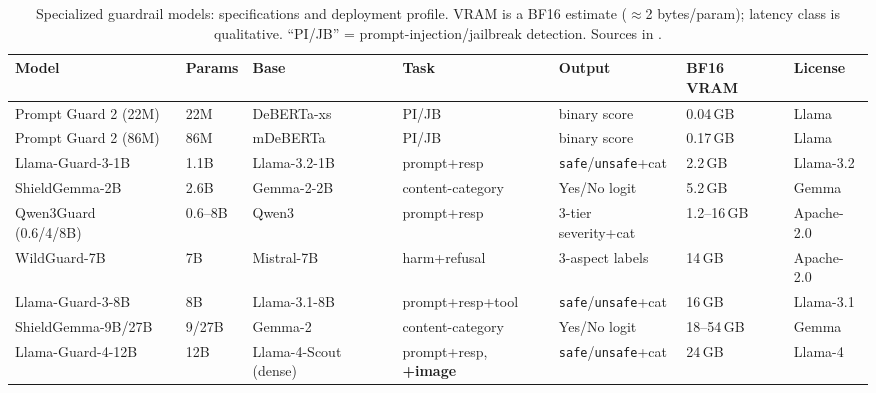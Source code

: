 \begin{table}[t]
\small\centering
\setlength{\tabcolsep}{4pt}
\caption{Specialized guardrail models: specifications and deployment profile. VRAM is a BF16 estimate ($\approx$2 bytes/param); latency class is qualitative. ``PI/JB'' = prompt-injection/jailbreak detection. Sources in .}
\label{tab:guardrail-specs}
\begin{tabular}{lllllll}
\toprule
Model & Params & Base & Task & Output & BF16 VRAM & License \\
\midrule
Prompt Guard 2 (22M)~\cite{meta2025promptguard2_22m} & 22M & DeBERTa-xs & PI/JB & binary score & 0.04\,GB & Llama \\
Prompt Guard 2 (86M)~\cite{meta2025promptguard2_86m} & 86M & mDeBERTa & PI/JB & binary score & 0.17\,GB & Llama \\
Llama-Guard-3-1B~\cite{meta2024llamaguard3_1b} & 1.1B & Llama-3.2-1B & prompt+resp & \texttt{safe}/\texttt{unsafe}+cat & 2.2\,GB & Llama-3.2 \\
ShieldGemma-2B~\cite{zeng2024shieldgemma} & 2.6B & Gemma-2-2B & content-category & Yes/No logit & 5.2\,GB & Gemma \\
Qwen3Guard (0.6/4/8B)~\cite{qwen3guard2025} & 0.6--8B & Qwen3 & prompt+resp & 3-tier severity+cat & 1.2--16\,GB & Apache-2.0 \\
WildGuard-7B~\cite{han2024wildguard} & 7B & Mistral-7B & harm+refusal & 3-aspect labels & 14\,GB & Apache-2.0 \\
Llama-Guard-3-8B~\cite{meta2024llamaguard3_8b} & 8B & Llama-3.1-8B & prompt+resp+tool & \texttt{safe}/\texttt{unsafe}+cat & 16\,GB & Llama-3.1 \\
ShieldGemma-9B/27B~\cite{zeng2024shieldgemma} & 9/27B & Gemma-2 & content-category & Yes/No logit & 18--54\,GB & Gemma \\
Llama-Guard-4-12B~\cite{meta2025llamaguard4} & 12B & Llama-4-Scout (dense) & prompt+resp, \textbf{+image} & \texttt{safe}/\texttt{unsafe}+cat & 24\,GB & Llama-4 \\
\bottomrule
\end{tabular}
\end{table}

